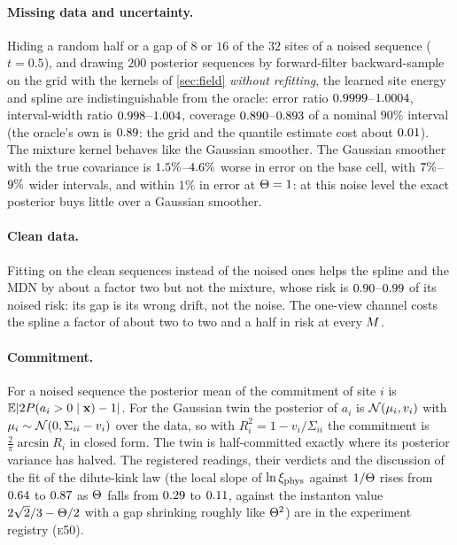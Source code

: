 \paragraph{Missing data and uncertainty.}
Hiding a random half or a gap of $8$ or $16$ of the $32$ sites of a noised sequence ($t=0.5$), and drawing $200$ posterior sequences by forward-filter
backward-sample on the grid with the kernels of \cref{sec:field} \emph{without refitting}, the learned site energy and spline are indistinguishable from the
oracle: error ratio $0.9999$--$1.0004$, interval-width ratio $0.998$--$1.004$,
coverage $0.890$--$0.893$ of a nominal $90\%$ interval (the oracle's own is $0.89$: the grid and the quantile estimate cost about $0.01$). The
mixture kernel behaves like the Gaussian smoother. The Gaussian smoother with the true covariance is $1.5\%$--$4.6\%$ worse
in error on the base cell, with $7\%$--$9\%$ wider intervals, and within $1\%$ in error at $\Theta=1$: at this noise level
the exact posterior buys little over a Gaussian smoother.

\paragraph{Clean data.}
Fitting on the clean sequences instead of the noised ones helps the spline and the MDN by about a factor two but not the mixture, whose
risk is $0.90$--$0.99$ of its noised risk: its gap is its wrong drift, not the noise. The one-view
channel costs the spline a factor of about two to two and a half in risk at every $M$.

\paragraph{Commitment.}
For a noised sequence the posterior mean of the commitment of site $i$ is $\mathbb{E}|2P(a_i>0\mid\mathbf{x})-1|$. For the Gaussian twin the posterior of $a_i$ is
$\mathcal{N}\!\left(\mu_i,v_i\right)$ with $\mu_i\sim\mathcal{N}\!\left(0,\Sigma_{ii}-v_i\right)$ over the data, so with $R_i^2=1-v_i/\Sigma_{ii}$ the commitment is
$\tfrac2\pi\arcsin R_i$ in closed form. The twin is half-committed exactly where its posterior variance has halved. The registered readings, their verdicts
and the discussion of the fit of the dilute-kink law (the local slope of $\ln\xi_{\mathrm{phys}}$ against $1/\Theta$ rises from $0.64$ to
$0.87$ as $\Theta$ falls from $0.29$ to $0.11$, against the instanton value $2\sqrt2/3-\Theta/2$ with a gap shrinking roughly like $\Theta^2$) are in the
experiment registry (\textsc{e50}).

